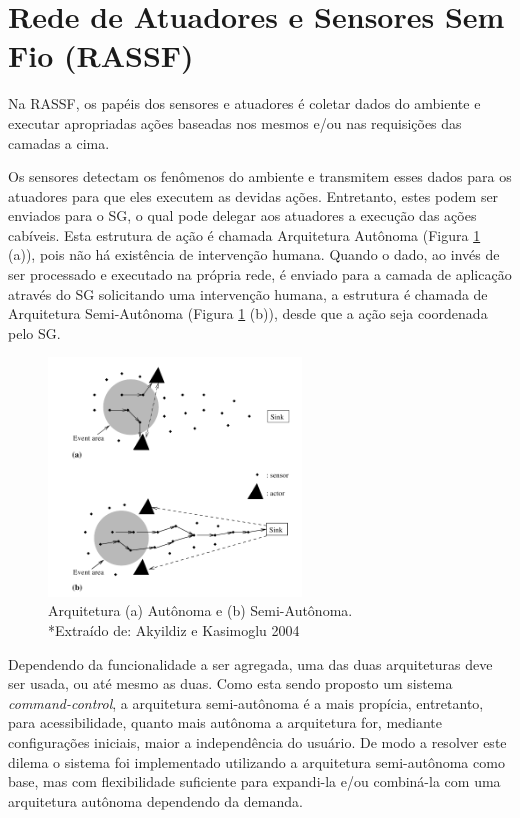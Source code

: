 \documentclass[12pt,a4paper,oneside]{report}
\begin{document}
\section{Rede de Atuadores e Sensores Sem Fio (RASSF)}

Na RASSF, os papéis dos sensores e atuadores é coletar dados do ambiente e executar apropriadas ações baseadas nos mesmos e/ou nas requisições das camadas a cima.

Os sensores detectam os fenômenos do ambiente e transmitem esses dados para os atuadores para que eles executem as devidas ações. Entretanto, estes podem ser enviados para o SG, o qual pode delegar aos atuadores a execução das ações cabíveis. Esta estrutura de ação é chamada Arquitetura Autônoma (Figura \ref{fig:arquitetura-autonoma} (a)), pois não há existência de intervenção humana. Quando o dado, ao invés de ser processado e executado na própria rede, é enviado para a camada de aplicação através do SG solicitando uma intervenção humana, a estrutura é chamada de Arquitetura Semi-Autônoma (Figura \ref{fig:arquitetura-autonoma} (b)), desde que a ação seja coordenada pelo SG.

\begin{figure}[htbp]
   \centering
    \includegraphics[width=0.6\textwidth]{figuras/figura_2_6}
	\caption{Arquitetura (a) Autônoma e (b) Semi-Autônoma. \\ *\footnotesize Extraído de: Akyildiz e Kasimoglu 2004 \cite{wsaniais}}
    \label{fig:arquitetura-autonoma}
\end{figure}

Dependendo da funcionalidade a ser agregada, uma das duas arquiteturas deve ser usada, ou até mesmo as duas. Como esta sendo proposto um sistema \emph{command-control}, a arquitetura semi-autônoma é a mais propícia, entretanto, para acessibilidade, quanto mais autônoma a arquitetura for, mediante configurações iniciais, maior a independência do usuário. De modo a resolver este dilema o sistema foi implementado utilizando a arquitetura semi-autônoma como base, mas com flexibilidade suficiente para expandi-la e/ou combiná-la com uma arquitetura autônoma dependendo da demanda.
\end{document}
